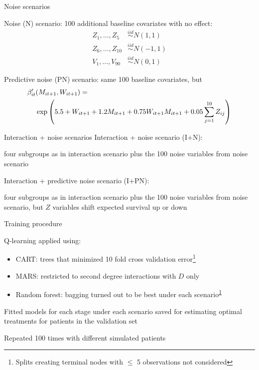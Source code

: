 \documentclass[handout]{beamer}
\begin{document}
\begin{frame}[c]{Noise scenarios}
  
  Noise (N) scenario: 100 additional baseline covariates with no effect:
  \begin{align*}
    Z_{1}, \ldots, Z_{5} &\overset{iid}{\sim} N(1, 1) \\
    Z_{6}, \ldots, Z_{10} &\overset{iid}{\sim} N(-1, 1) \\
    V_{1}, \ldots, V_{90} &\overset{iid}{\sim} N(0, 1)
  \end{align*}
  
  Predictive noise (PN) scenario: same 100 baseline covariates, but
  \begin{align*}
    \beta'_{it}&(M_{it+1}, W_{it+1}) = \\
    &\exp\del{5.5 + W_{it+1} + 1.2 M_{it+1} + 0.75 W_{it+1} M_{it+1} + 0.05 \sum_{j = 1}^{10} Z_{ij}}
  \end{align*}
\end{frame}

\begin{frame}[c]{Interaction + noise scenarios}
  Interaction + noise scenario (I+N):
  
  four subgroups as in interaction scenario plus the 100 noise variables from noise scenario
  
  \bigskip
  
  Interaction + predictive noise scenario (I+PN):
  
  four subgroups as in interaction scenario plus the 100 noise variables from noise scenario, but $Z$ variables shift expected survival up or down
\end{frame}


\begin{frame}[c]{Training procedure}
  
  Q-learning applied using:
  \begin{itemize}
    \item CART: trees that minimized 10 fold cross validation error\footnote{\label{tree} Splits creating terminal nodes with $\leq$ 5 observations not considered}
    \item MARS: restricted to second degree interactions with $D$ only
    \item Random forest: bagging turned out to be best under each scenario\textsuperscript{\ref{tree}}
  \end{itemize}
  
  Fitted models for each stage under each scenario saved for estimating optimal treatments for patients in the validation set
  
  Repeated 100 times with different simulated patients
\end{frame}
\end{document}
